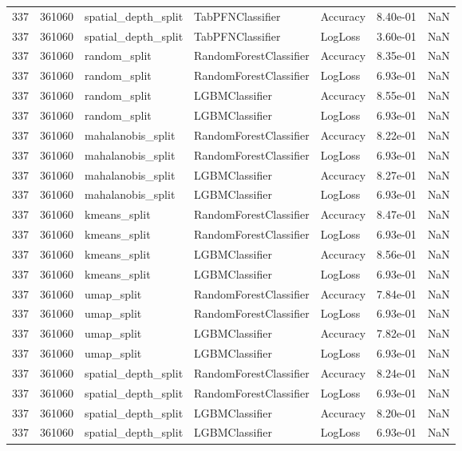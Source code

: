 \begin{tabular}{rrlllrr}
337 & 361060 & spatial\_depth\_split & TabPFNClassifier & Accuracy & 8.40e-01 & NaN \\
337 & 361060 & spatial\_depth\_split & TabPFNClassifier & LogLoss & 3.60e-01 & NaN \\
337 & 361060 & random\_split & RandomForestClassifier & Accuracy & 8.35e-01 & NaN \\
337 & 361060 & random\_split & RandomForestClassifier & LogLoss & 6.93e-01 & NaN \\
337 & 361060 & random\_split & LGBMClassifier & Accuracy & 8.55e-01 & NaN \\
337 & 361060 & random\_split & LGBMClassifier & LogLoss & 6.93e-01 & NaN \\
337 & 361060 & mahalanobis\_split & RandomForestClassifier & Accuracy & 8.22e-01 & NaN \\
337 & 361060 & mahalanobis\_split & RandomForestClassifier & LogLoss & 6.93e-01 & NaN \\
337 & 361060 & mahalanobis\_split & LGBMClassifier & Accuracy & 8.27e-01 & NaN \\
337 & 361060 & mahalanobis\_split & LGBMClassifier & LogLoss & 6.93e-01 & NaN \\
337 & 361060 & kmeans\_split & RandomForestClassifier & Accuracy & 8.47e-01 & NaN \\
337 & 361060 & kmeans\_split & RandomForestClassifier & LogLoss & 6.93e-01 & NaN \\
337 & 361060 & kmeans\_split & LGBMClassifier & Accuracy & 8.56e-01 & NaN \\
337 & 361060 & kmeans\_split & LGBMClassifier & LogLoss & 6.93e-01 & NaN \\
337 & 361060 & umap\_split & RandomForestClassifier & Accuracy & 7.84e-01 & NaN \\
337 & 361060 & umap\_split & RandomForestClassifier & LogLoss & 6.93e-01 & NaN \\
337 & 361060 & umap\_split & LGBMClassifier & Accuracy & 7.82e-01 & NaN \\
337 & 361060 & umap\_split & LGBMClassifier & LogLoss & 6.93e-01 & NaN \\
337 & 361060 & spatial\_depth\_split & RandomForestClassifier & Accuracy & 8.24e-01 & NaN \\
337 & 361060 & spatial\_depth\_split & RandomForestClassifier & LogLoss & 6.93e-01 & NaN \\
337 & 361060 & spatial\_depth\_split & LGBMClassifier & Accuracy & 8.20e-01 & NaN \\
337 & 361060 & spatial\_depth\_split & LGBMClassifier & LogLoss & 6.93e-01 & NaN \\

\end{tabular}
